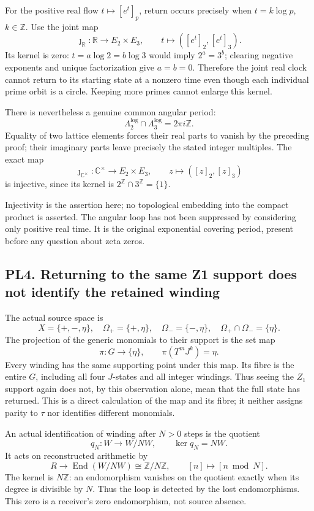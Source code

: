 For the positive real flow \(t\mapsto[e^t]_p\), return occurs precisely
when \(t=k\log p\), \(k\in\mathbb Z\). Use the joint map \[
\jmath_{\mathbb R}:\mathbb R\longrightarrow E_2\times E_3,\qquad
t\longmapsto([e^t]_2,[e^t]_3).
\tag{PL3.3}
\] Its kernel is zero: \(t=a\log2=b\log3\) would imply \(2^a=3^b\);
clearing negative exponents and unique factorization give \(a=b=0\).
Therefore the joint real clock cannot return to its starting state at a
nonzero time even though each individual prime orbit is a circle.
Keeping more primes cannot enlarge this kernel.

There is nevertheless a genuine common angular period: \[
\Lambda_2^{\log}\cap\Lambda_3^{\log}=2\pi i\mathbb Z.
\tag{PL3.4}
\] Equality of two lattice elements forces their real parts to vanish by
the preceding proof; their imaginary parts leave precisely the stated
integer multiples. The exact map \[
\jmath_{\mathbb C^\times}:\mathbb C^\times\longrightarrow E_2\times E_3,
\qquad z\longmapsto([z]_2,[z]_3)
\tag{PL3.5}
\] is injective, since its kernel is
\(2^\mathbb Z\cap3^\mathbb Z=\{1\}\).

Injectivity is the assertion here; no topological embedding into the
compact product is asserted. The angular loop has not been suppressed by
considering only positive real time. It is the original exponential
covering period, present before any question about zeta zeros.

\subsection{PL4. Returning to the same Z1 support does not identify the
retained
winding}\label{pl4.-returning-to-the-same-z1-support-does-not-identify-the-retained-winding}

The actual source space is \[
X=\{+,-,\eta\},\quad
\Omega_+=\{+,\eta\},\quad\Omega_-=\{-,\eta\},\quad
\Omega_+\cap\Omega_-=\{\eta\}.
\tag{PL4.1}
\] The projection of the generic monomials to their support is the set
map \[
\pi:G\longrightarrow\{\eta\},\qquad \pi(T^mJ^k)=\eta.
\tag{PL4.2}
\] Every winding has the same supporting point under this map. Its fibre
is the entire \(G\), including all four \(J\)-states and all integer
windings. Thus seeing the \(Z_1\) support again does not, by this
observation alone, mean that the full state has returned. This is a
direct calculation of the map and its fibre; it neither assigns parity
to \(\tau\) nor identifies different monomials.

An actual identification of winding after \(N>0\) steps is the quotient
\[
q_N:W\longrightarrow W/NW,\qquad \ker q_N=NW.
\tag{PL4.3}
\] It acts on reconstructed arithmetic by \[
R\longrightarrow\operatorname{End}(W/NW)\cong\mathbb Z/N\mathbb Z,\qquad
[n]\longmapsto[n\bmod N].
\tag{PL4.4}
\] The kernel is \(N\mathbb Z\): an endomorphism vanishes on the
quotient exactly when its degree is divisible by \(N\). Thus the loop is
detected by the lost endomorphisms. This zero is a receiver's zero
endomorphism, not source absence.

